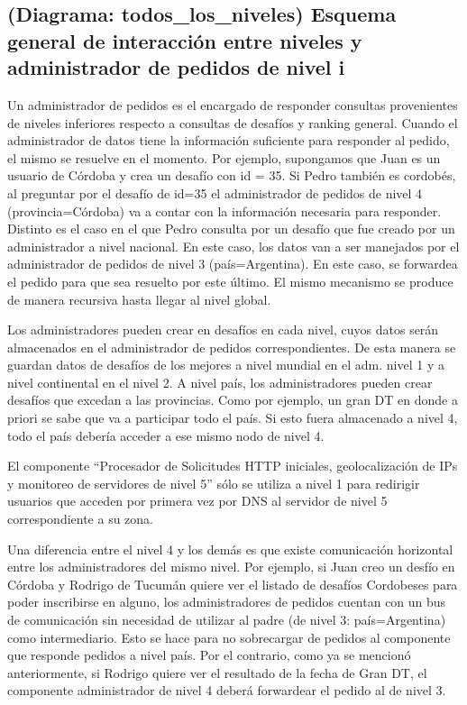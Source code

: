 \subsection{(Diagrama: todos_los_niveles) Esquema general de interacción entre niveles y administrador de pedidos de nivel i}

Un administrador de pedidos es el encargado de responder consultas provenientes de niveles inferiores respecto a consultas de desafíos y ranking general. Cuando el administrador de datos tiene la información suficiente para responder al pedido, el
mismo se resuelve en el momento. Por ejemplo, supongamos que Juan es un usuario de Córdoba y crea un desafío con id = 35.
Si Pedro también es cordobés, al preguntar por el desafío de id=35 el administrador de pedidos de nivel 4 (provincia=Córdoba) va a contar con la información necesaria para responder.
Distinto es el caso en el que Pedro consulta por un desafío que fue creado por un administrador a nivel nacional. En este caso, los datos van a ser manejados por el administrador de pedidos de nivel 3 (país=Argentina). En este caso, se forwardea el
pedido para que sea resuelto por este último.
El mismo mecanismo se produce de manera recursiva hasta llegar al nivel global.

Los administradores pueden crear en desafíos en cada nivel, cuyos datos serán almacenados en el administrador de pedidos
correspondientes. De esta manera se guardan datos de desafíos de los mejores a nivel mundial en el adm. nivel 1 y a nivel continental en el nivel 2. A nivel país, los administradores pueden crear desafíos que excedan a las provincias. Como por ejemplo, un gran DT en donde a priori se sabe que va a participar todo el país. Si esto fuera almacenado a nivel 4, todo el país debería acceder a ese mismo nodo de nivel 4.

El componente ``Procesador de Solicitudes HTTP iniciales, geolocalización de IPs y monitoreo de servidores de nivel 5'' sólo se utiliza a nivel 1 para redirigir usuarios que acceden por primera vez por DNS al servidor de nivel 5 correspondiente a su zona.

Una diferencia entre el nivel 4 y los demás es que existe comunicación horizontal entre los administradores del mismo nivel. Por ejemplo, si Juan creo un desfío en Córdoba y Rodrigo de Tucumán quiere ver el listado de desafíos Cordobeses para poder inscribirse en alguno, los administradores de pedidos cuentan con un bus de comunicación sin necesidad de utilizar
al padre (de nivel 3: país=Argentina) como intermediario. Esto se hace para no sobrecargar de pedidos al componente
que responde pedidos a nivel país. Por el contrario, como ya se mencionó anteriormente, si Rodrigo quiere ver el resultado de la fecha de Gran DT, el componente administrador de nivel 4 deberá forwardear el pedido al de nivel 3.

